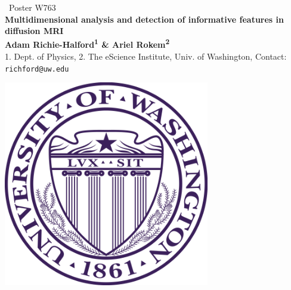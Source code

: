 \documentclass[a0, landscape]{a0poster}
\begin{document}


\begin{minipage}[b]{0.878\linewidth}
\Large ~Poster W763\\

\veryHuge \color{NavyBlue} \textbf{Multidimensional analysis and detection of informative features in diffusion MRI} \color{Black}\\ %
\huge \textbf{Adam Richie-Halford\textsuperscript{1} \& Ariel Rokem\textsuperscript{2}}\\ %
\Large 1. Dept. of Physics, 2. The eScience Institute, Univ. of Washington, %
\Large Contact: \texttt{richford@uw.edu}
\end{minipage}
%
%
\begin{minipage}[b]{0.12\linewidth}
\includegraphics[width=9cm]{UWlogo.png}
\end{minipage}
\end{document}
